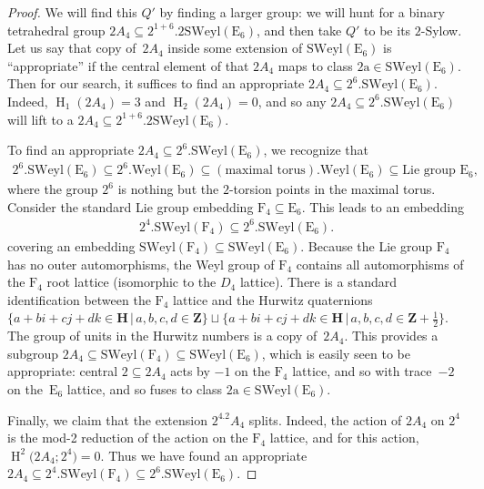\documentclass[pdftex]{sigma}
\numberwithin{equation}{section}
\newcommand\bH{\mathbf H}
\newcommand\bZ{\mathbf Z}
\newcommand\ra{\mathrm a}
\newcommand\rE{\mathrm E}
\newcommand\rF{\mathrm F}
\DeclareMathOperator\homology{H}
\renewcommand\H{\homology}
\newcommand\<\langle
\renewcommand\>\rangle
\newcommand\SWeyl{\mathrm{SWeyl}}
\begin{document}
\begin{proof} We will find this $Q'$ by finding a larger group: we will hunt for a binary tetrahedral group $2A_4 \subseteq 2^{1+6}.2\SWeyl (\rE_6)$, and then take $Q'$ to be its $2$-Sylow. Let us say that copy of~$2A_4$ inside some extension of $\SWeyl(\rE_6)$ is ``{appropriate}'' if the central element of that $2A_4$ maps to class $2\ra \in \SWeyl (\rE_6)$. Then for our search, it suffices to find an appropriate $2A_4 \subseteq 2^6.\SWeyl(\rE_6)$. Indeed, $\H_1(2A_4) = 3$ and $\H_2(2A_4) = 0$, and so any $2A_4 \subseteq 2^6.\SWeyl(\rE_6)$ will lift to a $2A_4 \subseteq 2^{1+6}.2\SWeyl (\rE_6)$.

To find an appropriate $2A_4 \subseteq 2^6.\SWeyl(\rE_6)$, we recognize that
 \begin{gather*} 2^6.\SWeyl(\rE_6) \subseteq 2^6.\mathrm{Weyl}(\rE_6) \subseteq (\text{maximal torus}).\mathrm{Weyl}(\rE_6) \subseteq \text{Lie group }\rE_6, \end{gather*}
 where the group $2^6$ is nothing but the $2$-torsion points in the maximal torus. Consider the standard Lie group embedding $\rF_4 \subseteq \rE_6$. This leads to an embedding
 \begin{gather*} 2^4.\SWeyl(\rF_4) \subseteq 2^6.\mathrm{SWeyl}(\rE_6). \end{gather*}
 covering an embedding $\SWeyl(\rF_4) \subseteq \mathrm{SWeyl}(\rE_6)$. Because the Lie group $\rF_4$ has no outer automorphisms, the Weyl group of $\rF_4$ contains all automorphisms of the $\rF_4$ root lattice (isomorphic to the $D_4$ lattice). There is a standard identification between the $\rF_4$ lattice and the Hurwitz quaternions $\big\{a + bi + cj + dk \in \bH \,|\, a,b,c,d \in \bZ\big\} \sqcup \big\{a + bi + cj + dk \in \bH \,|\, a,b,c,d \in \bZ+\frac12\big\}$. The group of units in the Hurwitz numbers is a copy of~$2A_4$. This provides a subgroup $2A_4 \subseteq \SWeyl(\rF_4) \subseteq \SWeyl(\rE_6)$, which is easily seen to be appropriate: central $2 \subseteq 2A_4$ acts by $-1$ on the $\rF_4$ lattice, and so with trace~$-2$ on the~$\rE_6$ lattice, and so fuses to class $2\ra \in \SWeyl(\rE_6)$.

 Finally, we claim that the extension $2^4.2A_4$ splits. Indeed, the action of $2A_4$ on $2^4$ is the mod-2 reduction of the action on the $\rF_4$ lattice, and for this action, $\H^2\big(2A_4; 2^4\big) = 0$. Thus we have found an appropriate $2A_4 \subseteq 2^4.\SWeyl(\rF_4) \subseteq 2^6.\mathrm{SWeyl}(\rE_6)$.
\end{proof}
\end{document}

